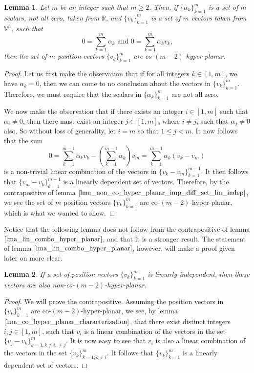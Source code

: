 \documentclass{article}
\newcommand{\R}{\mathbb{R}}
\newcommand{\V}{\mathbb{V}}
\newtheorem{lemma}{Lemma}[section]
\begin{document}
\begin{lemma}\label{lma_lin_combo_hyper_planar}
Let $m$ be an integer such that $m\geq 2$.
Then, if $\{\alpha_k\}_{k=1}^m$ is a set of $m$ scalars, not all zero, taken from $\R$,
and $\{v_k\}_{k=1}^m$ is a set of $m$ vectors taken from $\V^n$, such that
\begin{equation*}
\mbox{$0=\sum_{k=1}^m\alpha_k$ and $0=\sum_{k=1}^m\alpha_k v_k$,}
\end{equation*}
then the set of $m$ position vectors $\{v_k\}_{k=1}^m$ are co-$(m-2)$-hyper-planar.
\end{lemma}
\begin{proof}
Let us first make the observation that if for all integers $k\in[1,m]$, we have
$\alpha_k=0$, then we can come to no conclusion about the vectors in $\{v_k\}_{k=1}^m$.
Therefore, we must require that the scalars in $\{\alpha_k\}_{k=1}^m$ are not
all zero.

We now make the observation that if there exists an integer $i\in[1,m]$ such that
$\alpha_i\neq 0$, then there must exist an integer $j\in[1,m]$, where $i\neq j$, such
that $\alpha_j\neq 0$ also.
So without loss of generality, let $i=m$ so that $1\leq j<m$.
It now follows that the sum
\begin{equation*}
0 = \sum_{k=1}^{m-1}\alpha_k v_k - \left(\sum_{k=1}^{m-1}\alpha_k\right)v_m
 = \sum_{k=1}^{m-1}\alpha_k(v_k-v_m)
\end{equation*}
is a non-trivial linear combination of the vectors in $\{v_k-v_m\}_{k=1}^{m-1}$.
It then follows that $\{v_m-v_k\}_{k=1}^{m-1}$ is a linearly dependent set of vectors.
Therefore, by the contrapositive of lemma $\eqref{lma_non_co_hyper_planar_imp_diff_set_lin_indep}$,
we see the set of $m$ position vectors $\{v_k\}_{k=1}^m$ are co-$(m-2)$-hyper-planar,
which is what we wanted to show.
\end{proof}

Notice that the following lemma does not follow from the contrapositive of
lemma $\eqref{lma_lin_combo_hyper_planar}$, and that it is a stronger result.
The statement of lemma $\eqref{lma_lin_combo_hyper_planar}$, however, will make
a proof given later on more clear.

\begin{lemma}\label{lma_lin_indep_imp_non_co_hyper_planar}
If a set of position vectors $\{v_k\}_{k=1}^m$ is linearly independent, then
these vectors are also non-co-$(m-2)$-hyper-planar.
\end{lemma}
\begin{proof}
We will prove the contrapositive.  Assuming the position vectors in $\{v_k\}_{k=1}^m$
are co-$(m-2)$-hyper-planar, we see, by lemma $\eqref{lma_co_hyper_planar_characterization}$,
that there exist distinct integers $i,j\in[1,m]$, such that $v_i$ is a linear combination
of the vectors in the set $\{v_j-v_k\}_{k=1,k\neq i,\neq j}^m$.  It is now easy to see
that $v_i$ is also a linear combination of the vectors in the set $\{v_k\}_{k=1,k\neq i}^m$.
It follows that $\{v_k\}_{k=1}^m$ is a linearly dependent set of vectors.
\end{proof}
\end{document}

